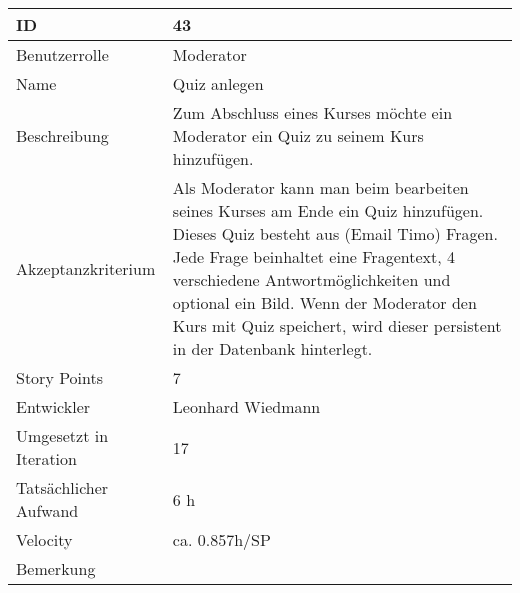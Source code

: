\begin{tabularx}{\textwidth}{|p{}|X|}
	\hline
	ID & 43\\
	\hline
	Benutzerrolle & Moderator\\
	\hline
	Name & Quiz anlegen\\
	\hline
	Beschreibung & Zum Abschluss eines Kurses möchte ein Moderator ein Quiz zu seinem Kurs hinzufügen. \\
	\hline
	Akzeptanzkriterium & Als Moderator kann man beim bearbeiten seines Kurses am Ende ein Quiz hinzufügen. Dieses Quiz besteht aus (Email Timo) Fragen. Jede Frage beinhaltet eine Fragentext, 4 verschiedene Antwortmöglichkeiten und optional ein Bild. Wenn der Moderator den Kurs mit Quiz speichert, wird dieser persistent in der Datenbank hinterlegt.\\
	\hline
	Story Points & 7\\
	\hline
	Entwickler & Leonhard Wiedmann\\
	\hline
	Umgesetzt in Iteration & 17\\
	\hline
	Tatsächlicher Aufwand & 6 h\\
	\hline
	Velocity & ca. 0.857h/SP \\
	\hline
	Bemerkung & \\
	\hline
\end{tabularx}
\vspace{20pt}

